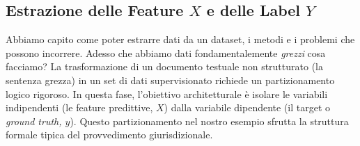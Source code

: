 \documentclass{article}
\begin{document}
\subsection{Estrazione delle Feature $X$ e delle Label $Y$}
Abbiamo capito come poter estrarre dati da un dataset, i metodi e i problemi che possono incorrere. Adesso che abbiamo dati fondamentalemente \textit{grezzi} cosa facciamo? La trasformazione di un documento testuale non strutturato (la sentenza grezza) in un set di dati supervisionato richiede un partizionamento logico rigoroso. In questa fase, l'obiettivo architetturale è isolare le variabili indipendenti (le feature predittive, $X$) dalla variabile dipendente (il target o \textit{ground truth, $y$}). Questo partizionamento nel nostro esempio sfrutta la struttura formale tipica del provvedimento giurisdizionale.
\end{document}
